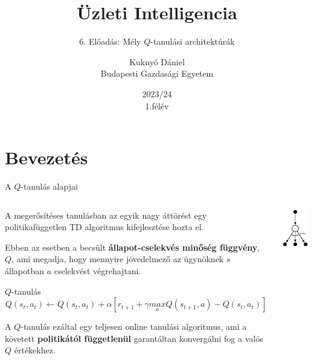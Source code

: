 \documentclass[english, aspectratio=169]{beamer}
\makeatletter
\newcommand\makebeamertitle{\frame{\maketitle}}
\let\origtableofcontents=\tableofcontents
\def\tableofcontents{\@ifnextchar[{\origtableofcontents}{\gobbletableofcontents}}
\def\gobbletableofcontents#1{\origtableofcontents}
\makeatother
\begin{document}
\section{Bevezetés}
\title[]{Üzleti Intelligencia}
\subtitle{6. Előadás: Mély $Q$-tanulási architektúrák}
\author[Kuknyó Dániel]{Kuknyó Dániel\\Budapesti Gazdasági Egyetem}
\date{2023/24\\1.félév}
\makebeamertitle

\begin{frame}
\tableofcontents{}
\end{frame}

\begin{frame}
\tableofcontents[currentsection]
\end{frame}

\begin{frame}{A $Q$-tanulás alapjai}
\begin{columns}
\begin{column}{.75\textwidth}
A megerősítéses tanulásban az egyik nagy áttörést egy politikafüggetlen TD algoritmus kifejlesztése hozta el.\par\smallskip
Ebben az esetben a becsült \textbf{állapot-cselekvés minőség függvény}, $Q$, ami megadja, hogy mennyire jövedelmező az ügynöknek $s$ állapotban $a$ cselekvést végrehajtani.
\begin{block}{$Q$-tanulás}
\[
Q(s_t,a_t) \leftarrow Q(s_t,a_t) + \alpha \left[ r_{t+1} + \gamma \underset{a}{max}Q(s_{t+1},a) - Q(s_t,a_t) \right]
\]
\end{block}
A $Q$-tanulás ezáltal egy teljesen online tanulási algoritmus, ami a követett \textbf{politikától függetlenül} garantáltan konvergálni fog a valós $Q$ értékekhez.
\end{column}
\begin{column}{.25\textwidth}
\begin{center}
\includegraphics[width=3cm, keepaspectratio]{../../5_ql/doc/images/ql_2.png}
\end{center}
\end{column}
\end{columns}
\end{frame}
\end{document}
